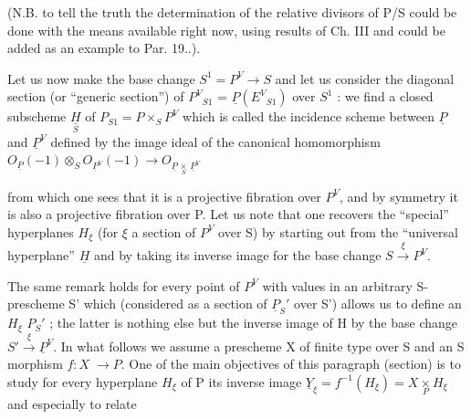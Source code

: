
(N.B. to tell the truth the determination of the relative divisors
of P/S could be done with the means available right now, using
results of Ch. III and could be added as an example to Par. 19..).

Let us now make the base change $S^1 = P^V \to S$ and let us
consider the diagonal section (or ``generic section'') of $P^V{}_{S1}$ =
$\underline{P}(E^V{}_{S1})$ over $S^1$ : we find a closed subscheme $\underset{S}{\underline{H}}$ of $P_{S1} = P \times_S P^V$
which is called the incidence scheme between $\underline{P}$ and $\underline{P}^V$ defined by
the image ideal of the canonical homomorphism
$O_{\underline{P}}(-1) \otimes_S O_{\underline{P}^V}(-1) \to O_{\underline{P}\,\underset{S}{\times}\,\underline{P}^V}$

from which one sees that it is a projective fibration over $P^V$, and
by symmetry it is also a projective fibration over P.  Let us note
that one recovers the ``special'' hyperplanes $H_\xi$ (for $\xi$ a section of
$P^V$ over S) by starting out from the ``universal hyperplane'' $\underline{H}$ and by
taking its inverse image for the base change $S \xrightarrow{\xi} P^V$.

The same remark holds for every point of $P^V$ with values in an
arbitrary S-prescheme S' which (considered as a section of $\underline{P}_S{}'$ over
S') allows us to define an $H_\xi$ \hand{$\subset$} $P_S{}'$ ; the latter is nothing else
but the inverse image of H by the base change $S' \xrightarrow{\xi} \underline{P}^V$.  In what
follows we assume a prescheme X of finite type over S and an S
morphism $f{:}X \;\to P$.  One of the main objectives of this paragraph
(section) is to study for every hyperplane $H_\xi$ of P its inverse
image $\underline{Y}_\xi = f^{-1}(H_\xi) = X \underset{P}{\times} H_\xi$ and especially to relate
